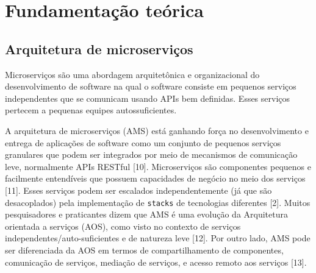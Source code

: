 \chapter{Fundamentação teórica}\label{cap_exemplos}


\section{Arquitetura de microserviços}

Microserviços são uma abordagem arquitetônica e organizacional do desenvolvimento de software na qual o software consiste em pequenos serviços independentes que se comunicam usando APIs bem definidas. Esses serviços pertecem a pequenas equipes autossuficientes.

A arquitetura de microserviços (AMS) está ganhando força no desenvolvimento e entrega de aplicações de software como um conjunto de pequenos serviços granulares que podem ser integrados por meio de mecanismos de comunicação leve, normalmente APIs RESTful [10]. Microserviços são componentes pequenos e facilmente entendíveis que possuem capacidades de negócio no meio dos serviços [11]. Esses serviços podem ser escalados independentemente (já que são desacoplados) pela implementação de \texttt{stacks} de tecnologias diferentes [2]. Muitos pesquisadores e praticantes dizem que AMS é uma evolução da Arquitetura orientada a serviços (AOS), como visto no contexto de serviços independentes/auto-suficientes e de natureza leve [12]. Por outro lado, AMS pode ser diferenciada da AOS em termos de compartilhamento de componentes, comunicação de serviços, mediação de serviços, e acesso remoto aos serviços [13]. 


